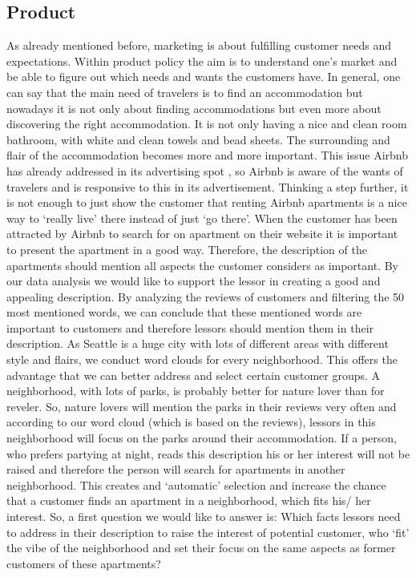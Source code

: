 \documentclass[journal]{IEEEtran}
\begin{document}
\subsection{Product}
\noindent As already mentioned before, marketing is about fulfilling customer needs and expectations. Within product policy the aim is to understand one’s market and be able to figure out which needs and wants the customers have. In general, one can say that the main need of travelers is to find an accommodation but nowadays it is not only about finding accommodations but even more about discovering the right accommodation. It is not only having a nice and clean room bathroom, with white and clean towels and bead sheets. The surrounding and flair of the accommodation becomes more and more important. This issue Airbnb has already addressed in its advertising spot , so Airbnb is aware of the wants of travelers and is responsive to this in its advertisement. Thinking a step further, it is not enough to just show the customer that renting Airbnb apartments is a nice way to ‘really live’ there instead of just ‘go there’. When the customer has been attracted by Airbnb to search for on apartment on their website it is important to present the apartment in a good way. Therefore, the description of the apartments should mention all aspects the customer considers as important. By our data analysis we would like to support the lessor in creating a good and appealing description. By analyzing the reviews of customers and filtering the 50 most mentioned words, we can conclude that these mentioned words are important to customers and therefore lessors should mention them in their description. As Seattle is a huge city with lots of different areas with different style and flairs, we conduct word clouds for every neighborhood. This offers the advantage that we can better address and select certain customer groups. A neighborhood, with lots of parks, is probably better for nature lover than for reveler. So, nature lovers will mention the parks in their reviews very often and according to our word cloud (which is based on the reviews), lessors in this neighborhood will focus on the parks around their accommodation. If a person, who prefers partying at night, reads this description his or her interest will not be raised and therefore the person will search for apartments in another neighborhood. This creates and ‘automatic’ selection and increase the chance that a customer finds an apartment in a neighborhood, which fits his/ her interest. So, a first question we would like to answer is: Which facts lessors need to address in their description to raise the interest of potential customer, who ‘fit’ the vibe of the neighborhood and set their focus on the same aspects as former customers of these apartments?
\end{document}

